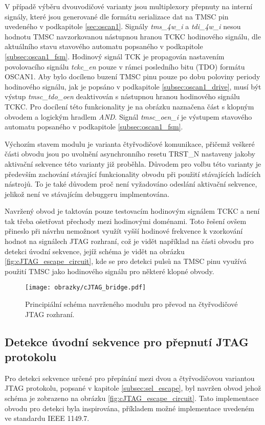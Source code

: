 V případě výběru dvouvodičové varianty jsou multiplexory přepnuty na interní signály, které jsou generované dle formátu serializace dat na \acs{TMSC} pin uvedeného v podkapitole \ref{sec:oscan1}. Signály \textit{tms\_4w\_i} a \textit{tdi\_4w\_i} nesou hodnotu \acs{TMSC} navzorkovanou nástupnou hranou \acs{TCKC} hodinového signálu, dle aktuálního stavu stavového automatu popsaného v podkapitole \ref{subsec:oscan1_fsm}. Hodinový signál TCK je propagován nastavením povolovacího signálu \textit{tckc\_en} pouze v rámci posledního bitu (TDO) formátu OSCAN1. Aby bylo docíleno buzení \acs{TMSC} pinu pouze po dobu poloviny periody hodinového signálu, jak je popsáno v podkapitole \ref{subsec:oscan1_drive}, musí být výstup \textit{tmsc\_tdo\_oen} deaktivován s nástupnou hranou hodinového signálu \acs{TCKC}. Pro docílení této funkcionality je na obrázku naznačena část s klopným obvodem a logickým hradlem \textit{AND}. Signál \textit{tmsc\_oen\_i} je výstupem stavového automatu popsaného v podkapitole \ref{subsec:oscan1_fsm}.

Výchozím stavem modulu je varianta čtyřvodičové komunikace, přičemž veškeré části obvodu jsou po uvolnění asynchronního resetu TRST\_N nastaveny jakoby aktivační sekvence této varianty již proběhla. Důvodem pro volbu této varianty je především zachování stávající funkcionality obvodu při použití stávajících ladících nástrojů. To je také důvodem proč není vyžadováno odeslání aktivační sekvence, jelikož není ve stávajícím debuggeru implmentována.

Navržený obvod je taktován pouze testovacím hodinovým signálem \acs{TCKC} a není tak třeba ošetřovat přechody mezi hodinovými doménami. Toto řešení ovšem přineslo při návrhu nemožnost využít vyšší hodinové frekvence k vzorkování hodnot na signálech \acs{JTAG} rozhraní, což je vidět například na části obvodu pro detekci úvodní sekvence, jejíž schéma je vidět na obrázku \ref{fig:cJTAG_escape_circuit}, kde se pro detekci pulsů na \acs{TMSC} pinu využívá použití \acs{TMSC} jako hodinového signálu pro některé klopné obvody.

\begin{figure}[!h]
  \begin{center}
    \texttt{[image: obrazky/cJTAG\_bridge.pdf]}
  \end{center}
  \caption{Principiální schéma navrženého modulu pro převod na čtyřvodičové \acs{JTAG} rozhraní.}
	\label{fig:cJTAG_bridge}
\end{figure}

\subsection{Detekce úvodní sekvence pro přepnutí \acs{JTAG} protokolu}	\label{subsec:sel_escape_det}
Pro detekci sekvence určené pro přepínání mezi dvou a čtyřvodičovou variantou \acs{JTAG} protokolu, popsané v kapitole \ref{subsec:sel_escape}, byl navržen obvod jehož schéma je zobrazeno na obrázku \ref{fig:cJTAG_escape_circuit}. Tato implementace obvodu pro detekci byla inspirována, příkladem možné implementace uvedeném ve standardu IEEE 1149.7.


